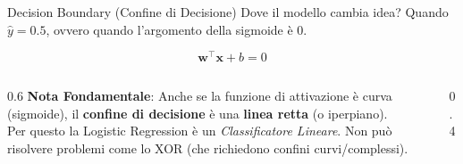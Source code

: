 \documentclass[aspectratio=169, 10pt]{beamer}
\begin{document}
\begin{frame}{Decision Boundary (Confine di Decisione)}
    Dove il modello cambia idea? Quando $\hat{y} = 0.5$, ovvero quando l'argomento della sigmoide è 0.
    
    \[ \mathbf{w}^\top \mathbf{x} + b = 0 \]
    
    \begin{columns}
        \begin{column}{0.6\textwidth}
            \textbf{Nota Fondamentale}:
            Anche se la funzione di attivazione è curva (sigmoide), il \textbf{confine di decisione} è una \textbf{linea retta} (o iperpiano).
            \\ \vspace{0.5em}
            Per questo la Logistic Regression è un \emph{Classificatore Lineare}. Non può risolvere problemi come lo XOR (che richiedono confini curvi/complessi).
        \end{column}
        \begin{column}{0.4\textwidth}
            \centering
        \end{column}
    \end{columns}
\end{frame}
\end{document}
